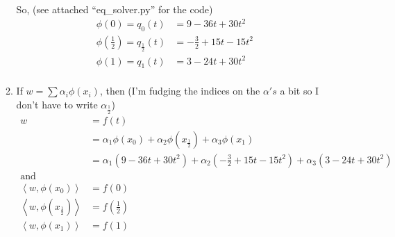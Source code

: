\documentclass[12pt]{article}
\newcommand{\parens}[1]{\left(#1\right)}
\newcommand{\chev}[1]{\left<#1\right>}
\begin{document}
\begin{enumerate}
\begin{enumerate}
                So, (see attached ``eq\_solver.py'' for the code)
                \begin{equation}
                    \begin{split}
                        \phi\parens{0}=q_0\parens{t}&=9-36t+30t^2\\
                        \phi\parens{\frac{1}{2}}=
                            q_{\frac{1}{2}}\parens{t}&=-\frac{3}{2}+15t-15t^2\\
                        \phi\parens{1}=q_1\parens{t}&=3-24t+30t^2\\
                    \end{split}
                \end{equation}
            \item
                If $w=\sum\alpha_i\phi\parens{x_i}$, then (I'm fudging the indices
                on the $\alpha's$ a bit so I don't have to write $\alpha_{\frac{1}{2}}$)
                \begin{equation}
                    \begin{split}
                        w&=f\parens{t}\\
                        &=\alpha_1\phi\parens{x_0}+\alpha_2\phi\parens{x_\frac{1}{2}}
                            +\alpha_3\phi\parens{x_1}\\
                        &=\alpha_1\parens{9-36t+30t^2}
                            +\alpha_2\parens{-\frac{3}{2}+15t-15t^2}
                            +\alpha_3\parens{3-24t+30t^2}\\
                        \text{and}\\
                        \chev{w, \phi\parens{x_0}}&=f\parens{0}\\
                        \chev{w, \phi\parens{x_\frac{1}{2}}}&=f\parens{\frac{1}{2}}\\
                        \chev{w, \phi\parens{x_1}}&=f\parens{1}\\
                    \end{split}
                \end{equation}


\end{enumerate}
\end{enumerate}
\end{document}
